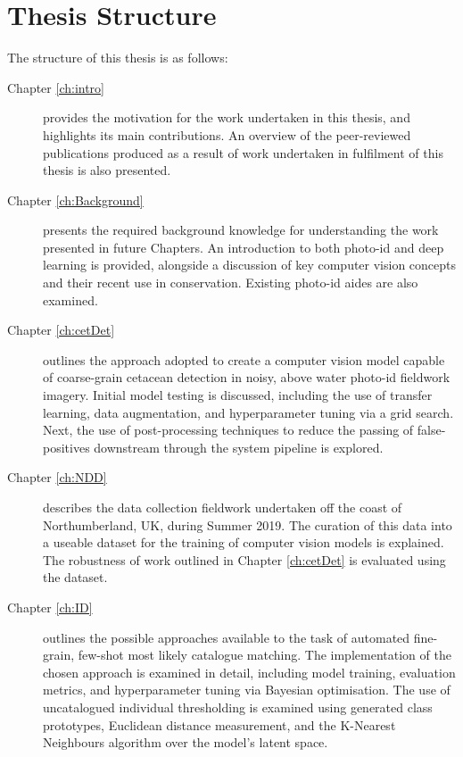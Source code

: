 \section{Thesis Structure}\label{ch:intro,sec:Structure}

The structure of this thesis is as follows:

\begin{description}
	\item[Chapter \ref{ch:intro}] provides the motivation for the work undertaken in this thesis, and highlights its main contributions. An overview of the peer-reviewed publications produced as a result of work undertaken in fulfilment of this thesis is also presented.
	
	\item[Chapter \ref{ch:Background}] presents the required background knowledge for understanding the work presented in future Chapters. An introduction to both photo-id and deep learning is provided, alongside a discussion of key computer vision concepts and their recent use in conservation. Existing photo-id aides are also examined.
	
	\item[Chapter \ref{ch:cetDet}] outlines the approach adopted to create a computer vision model capable of coarse-grain cetacean detection in noisy, above water photo-id fieldwork imagery. Initial model testing is discussed, including the use of transfer learning, data augmentation, and hyperparameter tuning via a grid search. Next, the use of post-processing techniques to reduce the passing of false-positives downstream through the system pipeline is explored. 
	
	\item[Chapter \ref{ch:NDD}] describes the data collection fieldwork undertaken off the coast of Northumberland, UK, during Summer 2019. The curation of this data into a useable dataset for the training of computer vision models is explained. The robustness of work outlined in Chapter \ref{ch:cetDet} is evaluated using the dataset. 
	
	\item[Chapter \ref{ch:ID}] outlines the possible approaches available to the task of automated fine-grain, few-shot most likely catalogue matching. The implementation of the chosen approach is examined in detail, including model training, evaluation metrics, and hyperparameter tuning via Bayesian optimisation. The use of uncatalogued individual thresholding is examined using generated class prototypes, Euclidean distance measurement, and the K-Nearest Neighbours algorithm over the model's latent space. 
	

\end{description}
